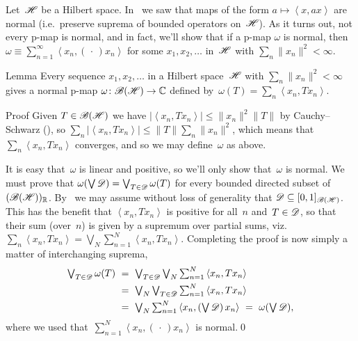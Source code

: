 \documentclass[a]{subfiles}
\begin{document}
\begin{parsec}%
\begin{point}%
Let~$\mathscr{H}$ be a Hilbert space.
In~
we saw that maps of the form $a\mapsto \left<x,ax\right>$
are normal 
(i.e.~preserve
suprema of bounded operators on~$\mathscr{H}$).
As it turns out,
not every p-map
is normal,
and in fact,
we'll show that if a p-map $\omega$ is normal,
then $\omega\equiv \sum_{n=1}^\infty \left<x_n,(\,\cdot\,)x_n\right>$
for some $x_1,x_2,\dotsc$ in~$\mathscr{H}$
with $\sum_n \|x_n\|^2 <\infty$.
\end{point}
\begin{point}{Lemma}%
Every sequence $x_1,x_2,\dotsc $ in a Hilbert space~$\mathscr{H}$
with $\sum_n \|x_n\|^2 < \infty$
gives a normal p-map $\omega\colon\mathscr{B}(\mathscr{H})\to\mathbb{C}$
defined by~$\omega(T)=\sum_n \left<x_n,Tx_n\right>$.
\begin{point}{Proof}%
Given $T\in\mathscr{B}(\mathscr{H})$ 
we have $\left|\left<x_n,Tx_n\right>\right|\leq \|x_n\|^2\|T\|$ 
by Cauchy--Schwarz (),
so $\sum_n \left|\left<x_n,Tx_n\right>\right|
\leq \|T\| \sum_n \|x_n\|^2$,
which means that~$\sum_n \left<x_n,Tx_n\right>$
converges, 
and so we may define~$\omega$ as above.

It is easy that~$\omega$ is linear and positive,
so we'll only show that~$\omega$ is normal.
We must prove that $\omega(\bigvee \mathscr{D})=\bigvee_{T\in\mathscr{D}} \omega(T)$
for every bounded directed subset of~$(\mathscr{B}(\mathscr{H}))_{\mathbb{R}}$.
By~
we may assume without loss of generality that 
$\mathscr{D}\subseteq [0,1]_{\mathscr{B}(\mathscr{H})}$.
This has the benefit that $\left<x_n,T x_n\right>$
is positive for all~$n$ and~$T\in\mathscr{D}$,
so that their sum (over~$n$) is given by
a supremum over partial sums, viz.~$\sum_n\left<x_n,Tx_n\right>
=\bigvee_N\sum_{n=1}^N\left<x_n,Tx_n\right>$.
Completing the proof is now simply a matter of
interchanging suprema,
\begin{alignat*}{3}
	\textstyle \bigvee_{T\in \scrD} \omega(T)
	\ &=\ 
	\textstyle\bigvee_{T\in \scrD} \bigvee_N \sum_{n=1}^N 
	\left<x_n,Tx_n\right>\\
	\ &=\ 
	\textstyle\bigvee_N \bigvee_{T\in \scrD}\sum_{n=1}^N 
	\left<x_n,Tx_n\right>\\
	\ &=\ 
	\textstyle\bigvee_N \sum_{n=1}^N \left<x_n,(\bigvee \scrD )\,x_n\right>
	\ =\ \textstyle\omega(\bigvee\scrD),
\end{alignat*}
where we used that~$\sum_{n=1}^N \left<x_n,(\,\cdot\,)x_n\right>$
is normal.\qed

\end{point}
\end{point}


\end{parsec}
\end{document}
